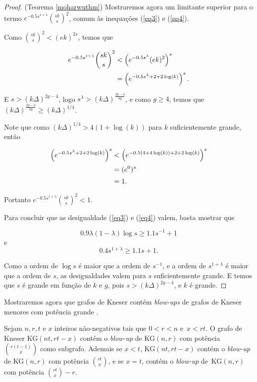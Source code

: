 \begin{proof}{(Teorema \ref{moharwuthm})}
Mostraremos agora um limitante superior para o termo $e^{-0.5s^{1+\lambda}}\binom{sk}{s}^2$, comum às inequações (\ref{eq3}) e (\ref{eq4}).

Como $\binom{sk}{s}^2 < (ek)^{2s}$, temos que

\begin{equation*}
\setlength{\jot}{5pt}
\begin{aligned}
e^{-0.5s^{1+\lambda}}\binom{sk}{s}^2 &< \left(e^{-0.5s^{\lambda}}(ek)^2\right)^s\\
&= \left(e^{-0.5s^\lambda + 2 + 2\log(k)}\right)^s.
\end{aligned}
\end{equation*}

E $s > (k\Delta)^{2g-4}$, logo $s^\lambda > (k\Delta)^{\frac{2g-4}{4g}}$, e como $g \geq 4$, temos que $(k\Delta)^{\frac{2g-4}{4g}} \geq (k\Delta)^{1/4}$. 

Note que como $(k\Delta)^{1/4} > 4(1+\log(k))$ para $k$ suficientemente grande, então

\begin{equation*}
\setlength{\jot}{5pt}
\begin{aligned}
\left(e^{-0.5s^\lambda + 2 + 2\log(k)}\right)^s &< \left(e^{-0.5(4+4\log(k)) + 2 + 2\log(k)}\right)^s\\ 
&= (e^0)^s \\
&= 1.
\end{aligned}
\end{equation*}

Portanto $e^{-0.5s^{1+\lambda}}\binom{sk}{s}^2 < 1$.

Para concluir que as desigualdade (\ref{eq3}) e (\ref{eq4}) valem, basta mostrar que

\[0.9\lambda(1-\lambda)\log s \geq 1.1s^{-1} + 1\]
e
\[0.4s^{1+\lambda}\geq 1.1s + 1.\]

Como a ordem de $\log s$ é maior que a ordem de $s^{-1}$, e a ordem de $s^{1+\lambda}$ é maior que a ordem de $s$, as desigualdades valem para $s$ suficientemente grande. E temos que $s$ é grande em função de $k$ e $g$, pois $s > (k\Delta)^{2g-4}$, e $k$ é grande.


\end{proof}

Mostraremos agora que grafos de Kneser contém \textit{blow-ups} de grafos de Kneser menores com potência grande \cite{mohar2016dichromatic}.

\begin{teorema}\label{moharwukn}
Sejam $n,r,t$ e $x$ inteiros não-negativos tais que $0 < r < n$ e~$x < rt$. O grafo de Kneser KG$(nt, rt-x)$ contém o \textit{blow-up} de KG$(n,r)$ com potência $\binom{r(t-1)}{x}$ como subgrafo. Ademais se $x < t$, KG$(nt, rt-x)$ contém o \textit{blow-up} de KG$(n,r)$ com potência $\binom{rt}{x}$, e se $x = t$, contém o \textit{blow-up} de~KG$(n,r)$ com potência $\binom{rt}{x}-r$.
\end{teorema}

